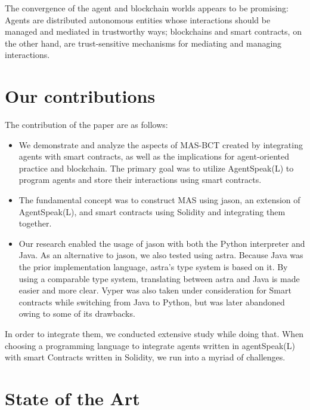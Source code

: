 \vspace{.5cm}
The convergence of the agent and blockchain worlds appears to be promising: Agents are distributed autonomous entities whose interactions should be managed and mediated in trustworthy ways; blockchains and smart contracts, on the other hand, are trust-sensitive mechanisms for mediating and managing interactions.

\section{Our contributions}

The contribution of the paper are as follows:

\begin{itemize}

    \item We demonstrate and analyze the aspects of \ac{MAS}-\ac{BCT} created by integrating agents with smart contracts, as well as the implications for agent-oriented practice and blockchain. The primary goal was to utilize AgentSpeak(L) to program agents and store their interactions using smart contracts.
    
    \item  The fundamental concept was to construct \ac{MAS} using jason, an extension of AgentSpeak(L), and smart contracts using Solidity and integrating them together.
    
    \item Our research enabled the usage of jason with both the Python interpreter and Java. As an alternative to jason, we also tested using astra. Because Java was the prior implementation language, astra's type system is based on it. By using a comparable type system, translating between astra and Java is made easier and more clear. Vyper was also taken under consideration for Smart contracts while switching from Java to Python, but was later abandoned owing to some of its drawbacks.
    
\end{itemize}

In order to integrate them, we conducted extensive study while doing that. When choosing a programming language to integrate agents written in agentSpeak(L) with smart Contracts written in Solidity, we run into a myriad of challenges.

\section{State of the Art}

